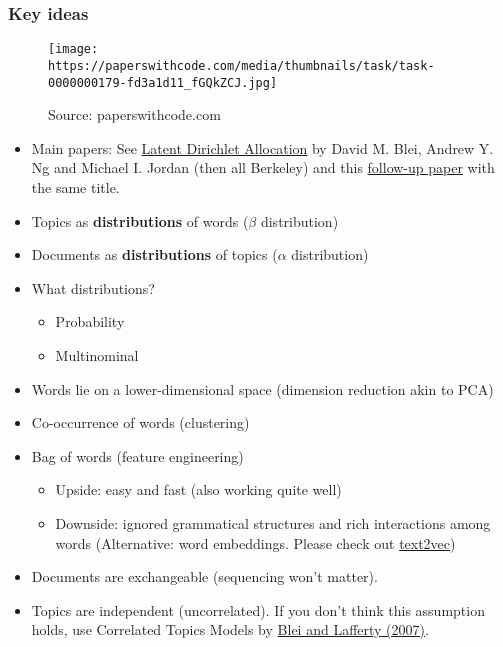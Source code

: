 \documentclass[
]{book}
\providecommand{\tightlist}{%
  \setlength{\itemsep}{0pt}\setlength{\parskip}{0pt}}
\begin{document}
\hypertarget{key-ideas}{%
\subsubsection{Key ideas}\label{key-ideas}}

\begin{figure}
\centering
\texttt{[image: https://paperswithcode.com/media/thumbnails/task/task-0000000179-fd3a1d11\_fGQkZCJ.jpg]}
\caption{Source: paperswithcode.com}
\end{figure}

\begin{itemize}
\item
  Main papers: See \href{https://proceedings.neurips.cc/paper/2001/file/296472c9542ad4d4788d543508116cbc-Paper.pdf}{Latent Dirichlet Allocation} by David M. Blei, Andrew Y. Ng and Michael I. Jordan (then all Berkeley) and this \href{http://www.cse.cuhk.edu.hk/irwin.king/_media/presentations/latent_dirichlet_allocation.pdf}{follow-up paper} with the same title.
\item
  Topics as \textbf{distributions} of words (\(\beta\) distribution)
\item
  Documents as \textbf{distributions} of topics (\(\alpha\) distribution)
\item
  What distributions?

  \begin{itemize}
  \item
    Probability
  \item
    Multinominal
  \end{itemize}
\item
  Words lie on a lower-dimensional space (dimension reduction akin to PCA)
\item
  Co-occurrence of words (clustering)
\item
  Bag of words (feature engineering)

  \begin{itemize}
  \tightlist
  \item
    Upside: easy and fast (also working quite well)
  \item
    Downside: ignored grammatical structures and rich interactions among words (Alternative: word embeddings. Please check out \href{http://text2vec.org/}{text2vec})
  \end{itemize}
\item
  Documents are exchangeable (sequencing won't matter).
\item
  Topics are independent (uncorrelated). If you don't think this assumption holds, use Correlated Topics Models by \href{https://arxiv.org/pdf/0708.3601.pdf\#:~:text=The\%20correlated\%20topic\%20model\%20(CTM)\%20is\%20a\%20hierarchical\%20model\%20of,are\%20document\%2D\%20specific\%20random\%20variables.}{Blei and Lafferty (2007)}.
\end{itemize}
\end{document}
